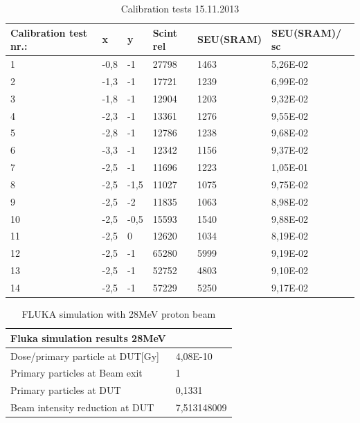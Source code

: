 \documentclass[12pt]{article}
\numberwithin{figure}{section}
\begin{document}
\begin{table}
  \centering
    \begin{tabular}{|l|l|l|l|l|l|}\hline
    Calibration test nr.: & x     & y     & Scint rel & SEU(\ac{SRAM}) & SEU(\ac{SRAM})/ sc \\ \hline \hline
    1     & -0,8  & -1    & 27798 & 1463  & 5,26E-02 \\ \hline
    2     & -1,3  & -1    & 17721 & 1239  & 6,99E-02 \\ \hline
    3     & -1,8  & -1    & 12904 & 1203  & 9,32E-02 \\ \hline
    4     & -2,3  & -1    & 13361 & 1276  & 9,55E-02 \\ \hline
    5     & -2,8  & -1    & 12786 & 1238  & 9,68E-02 \\ \hline
    6     & -3,3  & -1    & 12342 & 1156  & 9,37E-02 \\ \hline
    7     & -2,5  & -1    & 11696 & 1223  & 1,05E-01 \\ \hline
    8     & -2,5  & -1,5  & 11027 & 1075  & 9,75E-02 \\ \hline
    9     & -2,5  & -2    & 11835 & 1063  & 8,98E-02 \\ \hline
    10    & -2,5  & -0,5  & 15593 & 1540  & 9,88E-02 \\ \hline
    11    & -2,5  & 0     & 12620 & 1034  & 8,19E-02 \\ \hline
    12    & -2,5  & -1    & 65280 & 5999  & 9,19E-02 \\ \hline
    13    & -2,5  & -1    & 52752 & 4803  & 9,10E-02 \\ \hline
    14    & -2,5  & -1    & 57229 & 5250  & 9,17E-02 \\ \hline
    \end{tabular}%
      \caption{Calibration tests 15.11.2013}
\end{table}%

\begin{table}
  \centering
    \begin{tabular}{|l|l|} \hline
    Fluka simulation results 28MeV &  \\\hline\hline
    Dose/primary particle at DUT[Gy] & 4,08E-10 \\\hline
    Primary particles at Beam exit & 1 \\\hline
    Primary particles at DUT & 0,1331 \\\hline
    Beam intensity reduction  at DUT & 7,513148009 \\\hline
    \end{tabular}%
      \caption{FLUKA simulation with 28MeV proton beam}
\end{table}%
\end{document}

